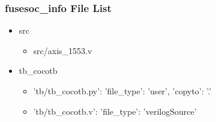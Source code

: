 \subsubsection{fusesoc\_info File List}
\begin{itemize}
\item src
	\begin{itemize}
	\item src/axis\_1553.v
	\end{itemize}
\item tb\_cocotb
	\begin{itemize}
	\item {'tb/tb\_cocotb.py': {'file\_type': 'user', 'copyto': '.'}}
	\item {'tb/tb\_cocotb.v': {'file\_type': 'verilogSource'}}
	\end{itemize}
\end{itemize}
